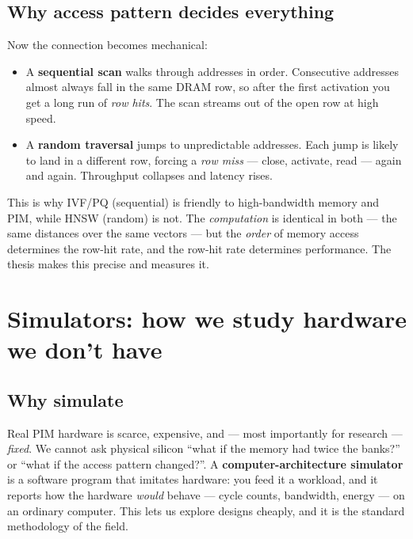 \documentclass[11pt,a4paper]{article}
\newcommand{\term}[1]{\textbf{\color{slate}#1}}
\begin{document}
\subsection{Why access pattern decides everything}

Now the connection becomes mechanical:

\begin{itemize}
\item A \term{sequential scan} walks through addresses in order. Consecutive addresses almost always
fall in the same DRAM row, so after the first activation you get a long run of \emph{row hits}. The
scan streams out of the open row at high speed.
\item A \term{random traversal} jumps to unpredictable addresses. Each jump is likely to land in a
different row, forcing a \emph{row miss} --- close, activate, read --- again and again. Throughput
collapses and latency rises.
\end{itemize}

\begin{keybox}
This is why IVF/PQ (sequential) is friendly to high-bandwidth memory and PIM, while HNSW (random)
is not. The \emph{computation} is identical in both --- the same distances over the same vectors ---
but the \emph{order} of memory access determines the row-hit rate, and the row-hit rate determines
performance. The thesis makes this precise and measures it.
\end{keybox}

\section{Simulators: how we study hardware we don't have}
\label{sec:sim}

\subsection{Why simulate}

Real PIM hardware is scarce, expensive, and --- most importantly for research --- \emph{fixed}. We
cannot ask physical silicon ``what if the memory had twice the banks?'' or ``what if the access
pattern changed?''. A \term{computer-architecture simulator} is a software program that imitates
hardware: you feed it a workload, and it reports how the hardware \emph{would} behave --- cycle
counts, bandwidth, energy --- on an ordinary computer. This lets us explore designs cheaply, and it
is the standard methodology of the field.
\end{document}
